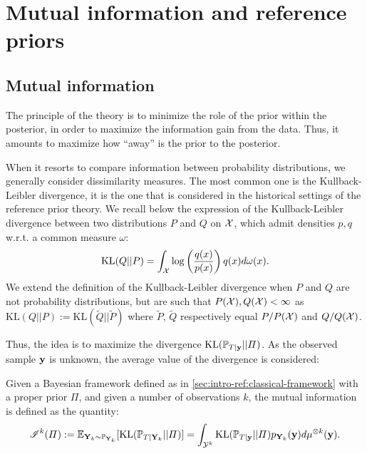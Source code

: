 
\section{Mutual information and reference priors}\label{sec:intro-ref:mutalinfo-ref-priors}

\subsection{Mutual information}\label{sec:intro-ref:mutualinfo}


The principle of the theory 
is to minimize the role of the prior within the posterior, in order to maximize the information gain from the data.
Thus, it amounts to maximize how ``away'' is the prior to the posterior.

When it resorts to compare information between probability distributions, we generally consider dissimilarity measures. The most common one is the Kullback-Leibler divergence, it is the one that is considered in the historical settings of the reference prior theory.
We recall below the expression of the Kullback-Leibler divergence between two distributions $P$ and $Q$ on $\mathcal{X}$, which admit densities $p,q$ w.r.t. a common measure $\omega$: %
    \begin{equation}
        \text{KL}(Q||P)=\int_{\mathcal{X}}\log\left(\frac{q(x)}{p(x)}\right)q(x)d\omega(x).
    \end{equation}
We extend the definition of the Kullback-Leibler divergence when $P$ and $Q$ are not probability distributions, but are such that $P(\mathcal{X}),Q(\mathcal{X})<\infty$ as $\text{KL}(Q||P):=\text{KL}(\tilde Q||\tilde P)$ where $\tilde P$, $\tilde Q$ respectively equal $P/P(\mathcal{X})$ and $Q/Q(\mathcal{X})$.

Thus, the idea is to maximize the divergence $\text{KL}(\mathbb{P}_{T|\mathbf{y}}||\varPi)$. As the observed sample $\mathbf{y}$ is unknown, the average value of the divergence is considered:
\begin{defi}\label{def:intro-ref-MI}
    Given a Bayesian framework defined as in \cref{sec:intro-ref:classical-framework} with a proper prior $\varPi$, and given a number of observations $k$, the mutual information is defined as the quantity: %
    \begin{equation}
        \mathscr{I}^k(\varPi) :=  \mathbb{E}_{\mathbf{Y}_k\sim \mathbb{P}_{\mathbf{Y}_k}}[\text{KL}(\mathbb{P}_{T|\mathbf{Y}_k}||\varPi)] =  \int_{\mathcal{Y}^k}\text{KL}(\mathbb{P}_{T|\mathbf{y}}||\varPi) p_{\mathbf{Y}_k}(\mathbf{y})d\mu^{\otimes k}(\mathbf{y}).
    \end{equation}
\end{defi}



